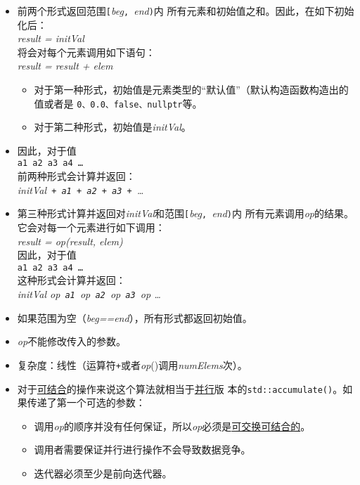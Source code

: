\begin{itemize}
    \item 前两个形式返回范围\texttt{[}\emph{beg}\texttt{, }\emph{end}\texttt{)}内
    所有元素和初始值之和。因此，在如下初始化后：\\
    \hspace*{2em}\emph{result = initVal}\\
    将会对每个元素调用如下语句：\\
    \hspace*{2em}\emph{result = result + elem}
    \begin{itemize}
        \item 对于第一种形式，初始值是元素类型的“默认值”（默认构造函数构造出的值或者是
        \texttt{0、0.0、false、nullptr}等。
        \item 对于第二种形式，初始值是\emph{initVal}。
    \end{itemize}
    \item 因此，对于值\\
    \hspace*{2em}\texttt{a1 a2 a3 a4 \ldots}\\
    前两种形式会计算并返回：\\
    \hspace*{2em}\emph{initVal\texttt{ + a1 + a2 + a3 + }\ldots}
    \item 第三种形式计算并返回对\emph{initVal}和范围\texttt{[}\emph{beg}\texttt{, }\emph{end}\texttt{)}内
    所有元素调用\emph{op}的结果。它会对每一个元素进行如下调用：\\
    \hspace*{2em}\emph{result = op(result, elem)}\\
    因此，对于值\\
    \hspace*{2em}\texttt{a1 a2 a3 a4 \ldots}\\
    这种形式会计算并返回：\\
    \hspace*{2em}\emph{initVal op\texttt{ a1 }op\texttt{ a2 }op\texttt{ a3 }op \ldots}
    \item 如果范围为空（\emph{beg==end}），所有形式都返回初始值。
    \item \emph{op}不能修改传入的参数。
    \item 复杂度：线性（运算符\texttt{+}或者\emph{op}()调用\emph{numElems}次）。
    \item 对于\hyperref[ch22.6.1.1]{可结合}的操作来说这个算法就相当于\hyperref[ch22]{并行}版
    本的\texttt{std::accumulate()}。如果传递了第一个可选的参数：
    \begin{itemize}
        \item 调用\emph{op}的顺序并没有任何保证，所以\emph{op}必须是\hyperref[ch22.6.1.1]{可交换可结合的}。
        \item 调用者需要保证并行进行操作不会导致数据竞争。
        \item 迭代器必须至少是前向迭代器。
    \end{itemize}
\end{itemize}
